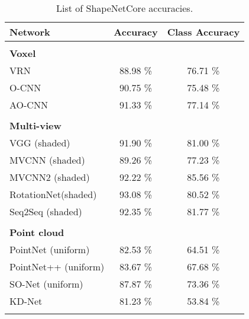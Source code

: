\begin{table}[]
	\centering
	\begin{tabular}{lcc}
		\hline
		\textbf{Network}       & \textbf{Accuracy} & \textbf{Class Accuracy} \\ \hline
		                       &                   &                         \\
		\textbf{Voxel }        &                   &                         \\
		VRN                    &     88.98 \%      &        76.71 \%         \\
		O-CNN                  &     90.75 \%      &        75.48 \%         \\
		AO-CNN                 &     91.33 \%      &        77.14 \%         \\ \hline
		                       &                   &                         \\
		\textbf{Multi-view }   &                   &                         \\
		VGG (shaded)           &     91.90 \%      &        81.00 \%         \\
		MVCNN (shaded)         &     89.26 \%      &        77.23 \%         \\
		MVCNN2 (shaded)        &     92.22 \%      &        85.56 \%         \\
		RotationNet(shaded)    &     93.08 \%      &        80.52 \%         \\
		Seq2Seq (shaded)       &     92.35 \%      &        81.77 \%         \\ \hline
		                       &                   &                         \\
		\textbf{Point cloud  } &                   &                         \\
		PointNet (uniform)     &     82.53 \%      &        64.51 \%         \\
		PointNet++ (uniform)   &     83.67 \%      &        67.68 \%         \\
		SO-Net (uniform)       &     87.87 \%      &        73.36 \%         \\
		KD-Net                 &     81.23 \%      &        53.84 \%         \\ \hline
		                       &                   &
	\end{tabular}
\caption{List of ShapeNetCore accuracies.}
\label{Table:saccs}
\end{table}